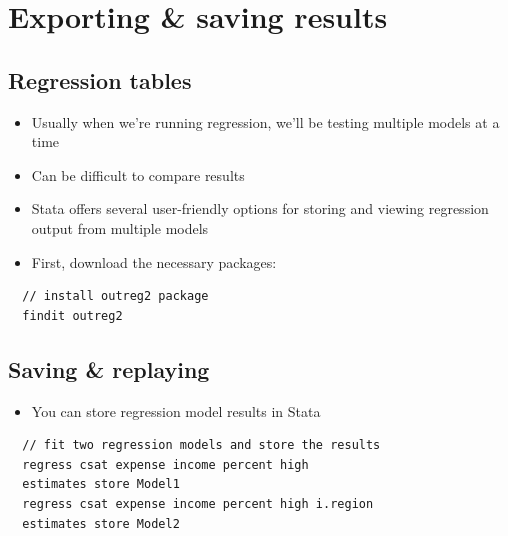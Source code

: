 \documentclass[]{book}
\providecommand{\tightlist}{%
  \setlength{\itemsep}{0pt}\setlength{\parskip}{0pt}}
\begin{document}
\section{Exporting \& saving results}\label{exporting-saving-results}

\subsection{Regression tables}\label{regression-tables}

\begin{itemize}
\tightlist
\item
  Usually when we're running regression, we'll be testing multiple
  models at a time
\item
  Can be difficult to compare results
\item
  Stata offers several user-friendly options for storing and viewing
  regression output from multiple models
\item
  First, download the necessary packages:
\end{itemize}

\begin{verbatim}
  // install outreg2 package
  findit outreg2
\end{verbatim}

\subsection{Saving \& replaying}\label{saving-replaying}

\begin{itemize}
\tightlist
\item
  You can store regression model results in Stata
\end{itemize}

\begin{verbatim}
  // fit two regression models and store the results
  regress csat expense income percent high
  estimates store Model1
  regress csat expense income percent high i.region
  estimates store Model2
\end{verbatim}
\end{document}
